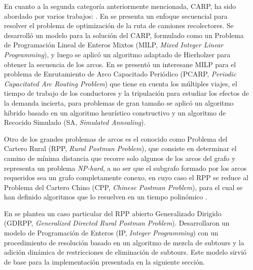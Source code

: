En cuanto a la segunda categoría anteriormente mencionada, CARP, ha sido abordado por varios trabajos: \citet{Vecchi2016ACollection,Tirkolaee2018ATime,Braier2017AnArgentina}. En \citet{Vecchi2016ACollection} se presenta un enfoque secuencial para resolver el problema de optimización de la ruta de camiones recolectores. Se desarrolló un modelo para la solución del CARP, formulado como un Problema de Programación Lineal de Enteros Mixtos (MILP, \textit{Mixed Integer Linear Programming}), y luego se aplicó un algoritmo adaptado de Hierholzer para obtener la secuencia de los arcos. En \citet{Tirkolaee2018ATime} se presentó un interesane MILP para el problema de Enrutamiento de Arco Capacitado Periódico (PCARP, \textit{Periodic Capacitated Arc Routing Problem}) que tiene en cuenta los múltiples viajes, el tiempo de trabajo de los conductores y la tripulación para estudiar los efectos de la demanda incierta, para problemas de gran tamaño se aplicó un algoritmo híbrido basado en un algoritmo heurístico constructivo y un algoritmo de Recocido Simulado (SA, \textit{Simulated Annealing}).

Otro de los grandes problemas de arcos es el conocido como Problema del Cartero Rural (RPP, \textit{Rural Postman Problem}), que consiste en determinar el camino de mínima distancia que recorre solo algunos de los arcos del grafo y representa un problema \textit{NP-hard}, a no ser que el subgrafo formado por los arcos requeridos sea un grafo completamente conexo, en cuyo caso el RPP se reduce al Problema del Cartero Chino (CPP, \textit{Chinese Postman Problem}), para el cual se han definido algoritmos que lo resuelven en un tiempo polinómico \citep{CalvinoM2011CooperacionPanoramica}.

En \citet{Braier2017AnArgentina} se plantea un caso particular del RPP abierto Generalizado Dirigido (GDRPP, \textit{Generalized Directed Rural Postman Problem}). Desarrollaron un modelo de Programación de Enteros (IP, \textit{Integer Programming}) con un procedimiento de resolución basado en un algoritmo de mezcla de subtours y la adición dinámica de restricciones de eliminación de subtours. Este modelo sirvió de base para la implementación presentada en la siguiente sección.



